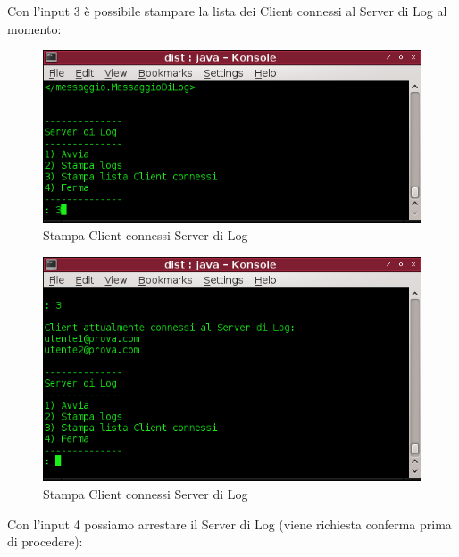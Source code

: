 \documentclass[a4paper, 11pt]{article} %
\begin{document}
Con l'input 3 \`e possibile stampare la lista dei Client connessi al Server di Log al momento:\\
\vspace{-0.8cm}
\begin{center}
\begin{figure}[H]
\includegraphics[width=1.0\textwidth]{images/server_di_log-7.png}
\vspace{-0.6cm}
\caption{Stampa Client connessi Server di Log}
\end{figure}
\end{center}
\begin{center}
\begin{figure}[H]
\includegraphics[width=1.0\textwidth]{images/server_di_log-8.png}
\vspace{-0.6cm}
\caption{Stampa Client connessi Server di Log}
\end{figure}
\end{center}
Con l'input 4 possiamo arrestare il Server di Log (viene richiesta conferma prima di procedere):\\
\vspace{-0.6cm}
\end{document}
